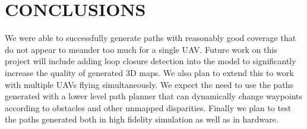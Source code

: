 \documentclass[letterpaper, 10 pt, conference]{ieeeconf}  %
\begin{document}
\section{CONCLUSIONS}\label{conclusions}

We were able to successfully generate paths with reasonably good coverage that do not appear to meander too much for a single UAV. Future work on this project will include adding loop closure detection into the model to significantly increase the quality of generated 3D maps. We also plan to extend this to work with multiple UAVs flying simultaneously. We expect the need to use the paths generated with a lower level path planner that can dynamically change waypoints according to obstacles and other unmapped disparities. Finally we plan to test the paths generated both in high fidelity simulation as well as in hardware.



\end{document}
